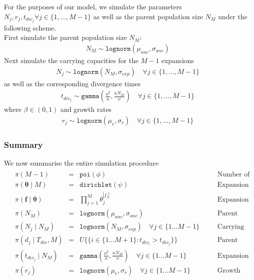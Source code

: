 \documentclass{report}
\theoremstyle{definition}
\begin{document}
For the purposes of our model, we simulate the parameters $N_j, r_j, t_{div_j} \forall j \in \{1,...,M-1\}$ as well as the parent population size $N_{M}$ under the following scheme.\\
First simulate the parent population size $N_{M}$:
\begin{gather}
N_{M} \sim \texttt{lognorm}(\mu_{anc}, \sigma_{anc})
\end{gather}
Next simulate the carrying capacities for the $M-1$ expansions
\begin{gather}
N_{j} \sim \texttt{lognorm}(N_{M}, \sigma_{exp}) \quad\forall j \in \{1,...,M-1\}
\end{gather}
as well as the corresponding divergence times
\begin{gather}
t_{div_j} \sim \texttt{gamma}\left(\frac{\nu^2}{\kappa}, \frac{\kappa N_M}{\nu}\right) \quad\forall j \in \{1,...,M-1\}
\end{gather}
where $\beta \in (0,1)$
and growth rates
\begin{gather}
r_{j} \sim \texttt{lognorm}(\mu_r, \sigma_r) \quad\forall j \in \{1,...,M-1\}
\end{gather} 
\subsubsection{Summary}
We now summarise the entire simulation procedure
\begin{gather}
\begin{aligned}
&\pi(M-1) &=& \texttt{poi}(\phi) &\quad&\text{Number of expansions} \\
&\pi(\pmb\theta\mid M) &=& \texttt{dirichlet}(\psi) &\quad&\text{Expansion Membership Probabilities} \\
&\pi(\mathbf{f\mid\pmb\theta}) &=& \prod\limits_{j=1}^M\theta_j^{|f_j|}&\quad&\text{Expansion Membership Assignment} \\
&\pi(N_M) &=& \texttt{lognorm}(\mu_{anc},\sigma_{anc}) &\quad&\text{Parent Population Size}\\
&\pi(N_j\mid N_{M}) &=& \texttt{lognorm}(N_{M},\sigma_{exp})\quad\forall j \in \{1...M-1\} &\quad&\text{Carrying Capacities}\\
&\pi(d_j\mid T_{div}, M) &=& U\{\{i\in \{1 ... M+1\} : t_{div_i} > t_{div_j}\}\} &\quad&\text{Parent Populations}\\
&\pi(t_{div_j}\mid N_{M}) &=& \texttt{gamma}\left(\frac{\nu^2}{\kappa}, \frac{\kappa N_M}{\nu}\right) \quad\forall j \in \{1...M-1\} &\quad&\text{Expansion Times}\\
&\pi(r_j) &=& \texttt{lognorm}(\mu_{r},\sigma_{r})\quad\forall j \in \{1...M-1\} &\quad&\text{Growth Rates}
\end{aligned}
\end{gather}
\end{document}
